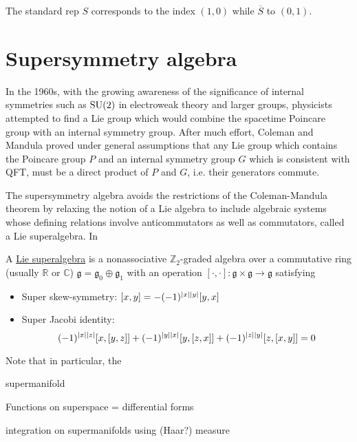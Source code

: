 The standard rep  $S$ corresponds to the index $(1,0)$ while $\overline{S}$ to $(0,1)$. 


\section{Supersymmetry algebra}
In the 1960s, with the growing awareness of the significance of internal
symmetries such as $\operatorname{SU}(2)$ in electroweak theory and larger groups,
physicists attempted to find a Lie group which would combine the spacetime
Poincare group with an internal symmetry group. After much effort, Coleman and
Mandula proved under general assumptions that any Lie group which contains the
Poincare group $P$ and an internal symmetry group $G$ which is consistent with
QFT, must be a direct product of $P$ and  $G$, i.e. their generators commute.

The supersymmetry algebra avoids the restrictions of the Coleman-Mandula theorem
by relaxing the notion of a Lie algebra to include algebraic systems whose
defining relations involve anticommutators as well as commutators, called
a Lie superalgebra. In 

\begin{defn}
	A \underline{Lie superalgebra} is a nonassociative 
	$\mathbb{Z}_2$-graded algebra over a commutative ring (usually $\mathbb{R}$
	or $\mathbb{C}$) $\mathfrak{g} = \mathfrak{g}_0 \oplus \mathfrak{g}_1$ with
	an operation $[\cdot,\cdot]:\mathfrak{g}\times \mathfrak{g} \to
	\mathfrak{g}$ satisfying 
	\begin{itemize}
		\item Super skew-symmetry: $[x,y] = -(-1)^{\abs{x}\abs{y}}[y,x]$
		\item Super Jacobi identity: 
		\[
			(-1)^{\abs{x}\abs{z}}[x,[y,z]]+(-1)^{\abs{y}\abs{x}}[y,[z,x]]
			+(-1)^{\abs{z}\abs{y}}[z,[x,y]]=0
		\]
	\end{itemize}
\end{defn}
Note that in particular, the 

\begin{defn}
	supermanifold
\end{defn}

Functions on superspace = differential forms

integration on supermanifolds using (Haar?) measure
